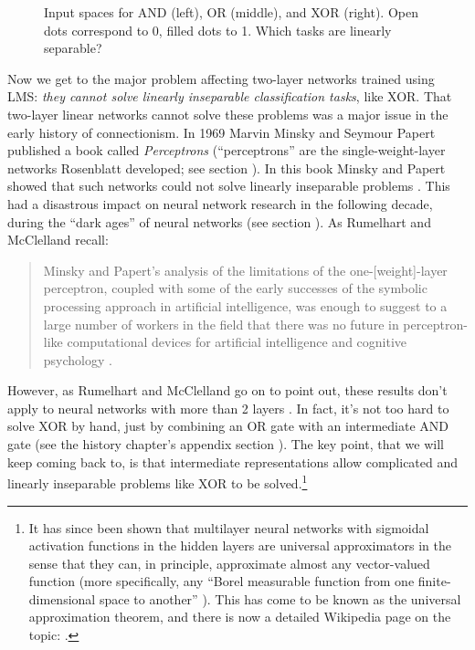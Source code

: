 \begin{figure}[h]
\centering
{}
\caption[Jeff Yoshimi.]{Input spaces for AND (left), OR (middle), and XOR (right). Open dots correspond to 0, filled dots to 1. Which tasks are linearly separable?}
\label{boolean_inputspace}
\end{figure}

Now we get to the major problem affecting two-layer networks trained using LMS: \emph{they cannot solve linearly inseparable classification tasks}, like XOR. That two-layer linear networks cannot solve these problems was a major issue in the early history of connectionism. In 1969 Marvin Minsky and Seymour Papert published a book called {\em Perceptrons} (``perceptrons'' are the single-weight-layer networks Rosenblatt developed; see section ). In this book Minsky and Papert showed that such networks could not solve linearly inseparable problems \cite{minsky1969perceptrons}. This had a disastrous impact on neural network research in the following decade, during the ``dark ages'' of neural networks (see section ). As Rumelhart and McClelland recall:

\begin{quote}
Minsky and Papert's analysis of the limitations of the one-[weight]-layer perceptron, coupled with some of the early successes of the symbolic processing approach in artificial intelligence, was enough to suggest to a large number of workers in the field that there was no future in perceptron-like computational devices for artificial intelligence and cognitive psychology \cite[p.~112]{rumelhart1986parallel}.
\end{quote}

However, as Rumelhart and McClelland go on to point out, these results don't apply to neural networks with more than 2 layers \cite{rumelhart1986parallel}. In fact, it's not too hard to solve XOR by hand, just by combining an OR gate with an intermediate AND gate (see the history chapter's appendix section ). The key point, that we will keep coming back to, is that intermediate representations allow complicated and linearly inseparable problems like XOR to be solved.\footnote{It has since been shown that multilayer neural networks with sigmoidal activation functions in the hidden layers are universal approximators in the sense that they can, in principle, approximate almost any vector-valued function (more specifically, any ``Borel measurable function from one finite-dimensional space to another'' \cite{hornik1989multilayer}). This has come to be known as the universal approximation theorem, and there is now a detailed Wikipedia page on the topic: .}

